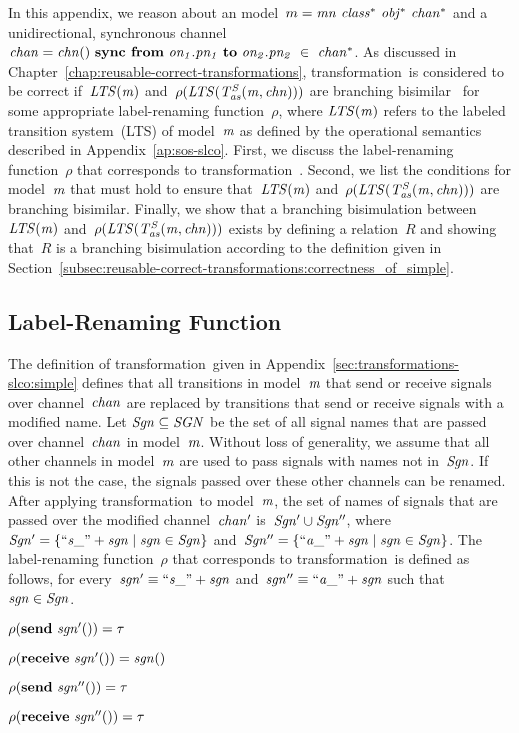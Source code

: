 In this appendix, we reason about an \SLCO model~$m = \it{mn}\ \it{class^*}\ \it{obj^*}\ \it{chan^*}$ and a unidirectional, synchronous channel~$\it{chan} = \it{chn}()\ \textbf{sync from}\ \it{on_1}.\it{pn_1}\ \textbf{to}\ \it{on_2}.\it{pn_2}\ \in \ \it{chan^*}$.
As discussed in Chapter~\ref{chap:reusable-correct-transformations}, transformation~\TSim is considered to be correct if~$\it{LTS}(m)$ and~$\rho(\it{LTS}(T^S_{\it{as}}(m, \it{chn})))$ are branching bisimilar~\cite{GlabWeijBisim96} for some appropriate label-renaming function~$\rho$,
where $\it{LTS}(m)$ refers to the labeled transition system~(LTS) of model~$\it{m}$ as defined by the operational semantics described in Appendix~\ref{ap:sos-slco}.
First, we discuss the label-renaming function~$\rho$ that corresponds to transformation~\TSim.
Second, we list the conditions for model~$\it{m}$ that must hold to ensure that~$\it{LTS}(m)$ and~$\rho(\it{LTS}(T^S_{\it{as}}(m, \it{chn})))$ are branching bisimilar.
Finally, we show that a branching bisimulation between~$\it{LTS}(m)$ and~$\rho(\it{LTS}(T^S_{\it{as}}(m, \it{chn})))$ exists by defining a relation~$R$ and showing that~$R$ is a branching bisimulation according to the definition given in Section~\ref{subsec:reusable-correct-transformations:correctness_of_simple}.

\subsection{Label-Renaming Function}
The definition of transformation~\TSim given in Appendix~\ref{sec:transformations-slco:simple} defines that all transitions in model~$\it{m}$ that send or receive signals over channel~$\it{chan}$ are replaced by transitions that send or receive signals with a modified name.
Let $\it{Sgn} \subseteq \it SGN$ be the set of all signal names that are passed over channel~$\it{chan}$ in model~$\it{m}$.
Without loss of generality, we assume that all other channels in model~$\it{m}$ are used to pass signals with names not in~$\it{Sgn}$.
If this is not the case, the signals passed over these other channels can be renamed.
After applying transformation~\TSim to model~$\it{m}$, the set of names of signals that are passed over the modified channel~$\it{chan'}$ is~$\it{Sgn'} \cup \it{Sgn''}$, where~$\it{Sgn'} = \{``s\_" + \it{sgn} \mid \it{sgn} \in \it{Sgn}\}$ and~$\it{Sgn''} = \{``a\_" + \it{sgn} \mid \it{sgn} \in \it{Sgn}\}$.
The label-renaming function~$\rho$ that corresponds to transformation~\TSim is defined as follows, for every~$\it{sgn'} \equiv ``s\_" + \it{sgn}$ and~$\it{sgn''} \equiv ``a\_" + \it{sgn}$ such that~$\it{sgn}\in \it{Sgn}$.
%
\begin{itemize*}
\item $\rho(\textbf{send}~\it{sgn'()}) = \tau$
\item $\rho(\textbf{receive}~\it{sgn'()}) = \it{sgn()}$
\item $\rho(\textbf{send}~\it{sgn''()}) = \tau$
\item $\rho(\textbf{receive}~\it{sgn''()}) = \tau$
\end{itemize*}

